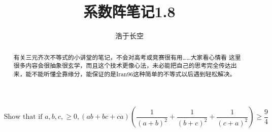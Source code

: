 \documentclass[UTF8]{ctexart}
\begin{document}
\title{系数阵笔记1.8}
\author{浩于长空}
\maketitle
$$\text { Show that if } a, b, c,\geq 0,(a b+b c+c a)\left(\dfrac{1}{(a+b)^{2}}+\dfrac{1}{(b+c)^{2}}+\dfrac{1}{(c+a)^{2}}\right) \geq \dfrac{9}{4}
$$
\begin{flushright}
\end{flushright}
\begin{displaymath}
\end{displaymath}
\begin{abstract}
	有关三元齐次不等式的小讲堂的笔记，不会对高考或竞赛很有用……大家看心情看
	这里很多内容会很抽象很玄学，而且这个技术更像心法，未必能把自己的思考完全传达出来，能不能听懂全靠缘分，能保证的是Iran96这种简单的不等式以后遇到轻松解决。
\end{abstract}

\newpage
\end{document}
